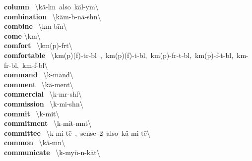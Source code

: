 \documentclass[10pt,a4paper]{article}
\begin{document}
\begin{multicols}{2}
\textbf{ column }\quad \ \textbackslash \textprimstress k\"{a}-l\textschwa m\ also\ \textprimstress k\"{a}l-y\textschwa m\textbackslash \\
\textbf{ combination }\quad \ \textbackslash \textsecstress k\"{a}m-b\textschwa -\textprimstress n\={a}-sh\textschwa n\textbackslash \\
\textbf{ combine }\quad \ \textbackslash k\textschwa m-\textprimstress b\={i}n\textbackslash \\
\textbf{ come }\quad \textbackslash \textprimstress k\textschwa m\textbackslash \\
\textbf{ comfort }\quad \ \textbackslash \textprimstress k\textschwa m(p)-f\textschwa rt\textbackslash \\
\textbf{ comfortable }\quad \ \textbackslash \textprimstress k\textschwa m(p)(f)-t\textschwa r-b\textschwa l\ ,\ \textprimstress k\textschwa m(p)(f)-t\textschwa -b\textschwa l,\ \textprimstress k\textschwa m(p)-f\textschwa r-t\textschwa -b\textschwa l,\ \textprimstress k\textschwa m(p)-f\textschwa -t\textschwa -b\textschwa l,\ \textprimstress k\textschwa m-f\textschwa r-b\textschwa l,\ \textprimstress k\textschwa m-f\textschwa -b\textschwa l\textbackslash \\
\textbf{ command }\quad \ \textbackslash k\textschwa -\textprimstress mand\textbackslash \\
\textbf{ comment }\quad \ \textbackslash \textprimstress k\"{a}-\textsecstress ment\textbackslash \\
\textbf{ commercial }\quad \ \textbackslash k\textschwa -\textprimstress m\textschwa r-sh\textschwa l\textbackslash \\
\textbf{ commission }\quad \ \textbackslash k\textschwa -\textprimstress mi-sh\textschwa n\textbackslash \\
\textbf{ commit }\quad \ \textbackslash k\textschwa -\textprimstress mit\textbackslash \\
\textbf{ commitment }\quad \ \textbackslash k\textschwa -\textprimstress mit-m\textschwa nt\textbackslash \\
\textbf{ committee }\quad \ \textbackslash k\textschwa -\textprimstress mi-t\={e}\ ,\ sense\ 2\ also\ \textsecstress k\"{a}-mi-\textprimstress t\={e}\textbackslash \\
\textbf{ common }\quad \ \textbackslash \textprimstress k\"{a}-m\textschwa n\textbackslash \\
\textbf{ communicate }\quad \ \textbackslash k\textschwa -\textprimstress my\"{u}-n\textschwa -\textsecstress k\={a}t\textbackslash \\

\end{multicols}
\end{document}
